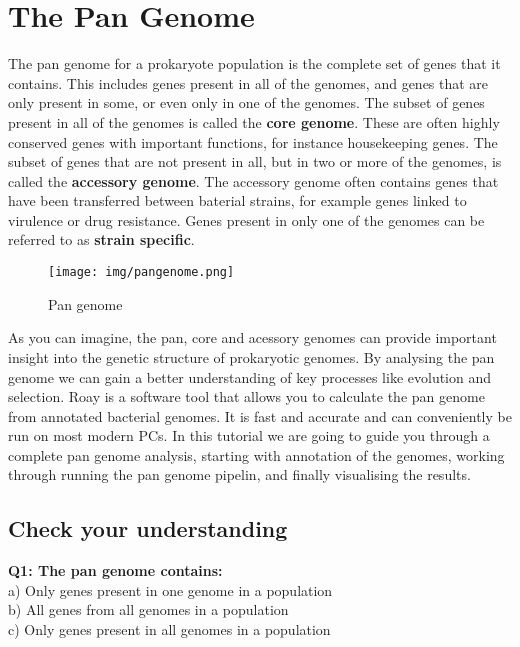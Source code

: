 \documentclass[11pt]{article}
\begin{document}



\newpage





    \hypertarget{the-pan-genome}{%
\section{The Pan Genome}\label{the-pan-genome}}

The pan genome for a prokaryote population is the complete set of genes
that it contains. This includes genes present in all of the genomes, and
genes that are only present in some, or even only in one of the genomes.
The subset of genes present in all of the genomes is called the
\textbf{core genome}. These are often highly conserved genes with
important functions, for instance housekeeping genes. The subset of
genes that are not present in all, but in two or more of the genomes, is
called the \textbf{accessory genome}. The accessory genome often
contains genes that have been transferred between baterial strains, for
example genes linked to virulence or drug resistance. Genes present in
only one of the genomes can be referred to as \textbf{strain specific}.

    \begin{figure}
\centering
\texttt{[image: img/pangenome.png]}
\caption{Pan genome}
\end{figure}

    As you can imagine, the pan, core and acessory genomes can provide
important insight into the genetic structure of prokaryotic genomes. By
analysing the pan genome we can gain a better understanding of key
processes like evolution and selection. Roay is a software tool that
allows you to calculate the pan genome from annotated bacterial genomes.
It is fast and accurate and can conveniently be run on most modern PCs.
In this tutorial we are going to guide you through a complete pan genome
analysis, starting with annotation of the genomes, working through
running the pan genome pipelin, and finally visualising the results.

\hypertarget{check-your-understanding}{%
\subsection{Check your understanding}\label{check-your-understanding}}

\textbf{Q1: The pan genome contains:}\\
a) Only genes present in one genome in a population\\
b) All genes from all genomes in a population\\
c) Only genes present in all genomes in a population
\end{document}
